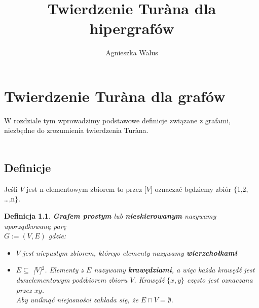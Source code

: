 \documentclass[miz,woman]{mgrwms}
\title{ Twierdzenie Tur\`{a}na dla hipergrafów}
\author{ Agnieszka Walus}
\begin{document}
\newtheorem{defi}{Definicja}[section]
\newtheorem{tw}{Twierdzenie}[section]
\newtheorem{lem}[tw]{Lemat}
\theoremstyle{definition}
\newtheorem{przy}{Przykład}[section]


\chapter{Twierdzenie Tur\`{a}na dla grafów}
W rozdziale tym wprowadzimy podstawowe definicje związane z grafami, niezbędne do zrozumienia twierdzenia Tur\`{a}na.\\
\\
\section{Definicje}
Jeśli $V$ jest n-elementowym zbiorem to przez [$V$] oznaczać będziemy zbiór $\{$1,2, \dots ,n$\}$.
\begin{defi}
\textbf{Grafem prostym} lub \textbf{nieskierowanym} nazywamy uporządkowaną parę \\$G:=(V,E)$ gdzie:\\
\begin{itemize}
 \item $V$ jest niepustym zbiorem, którego elementy nazywamy \textbf{wierzchołkami}
 \item $E \subseteq$ [$V$]$^2$. Elementy z $E$ nazywamy \textbf{krawędziami}, a więc każda krawędź jest dwuelementowym
podzbiorem zbioru $V$. Krawędź $\{x,y\}$ często jest oznaczana przez $xy$.\\
Aby uniknąć niejasności zakłada się, że $E \cap V=\emptyset$.
\end{itemize}

\end{defi}
\end{document}
